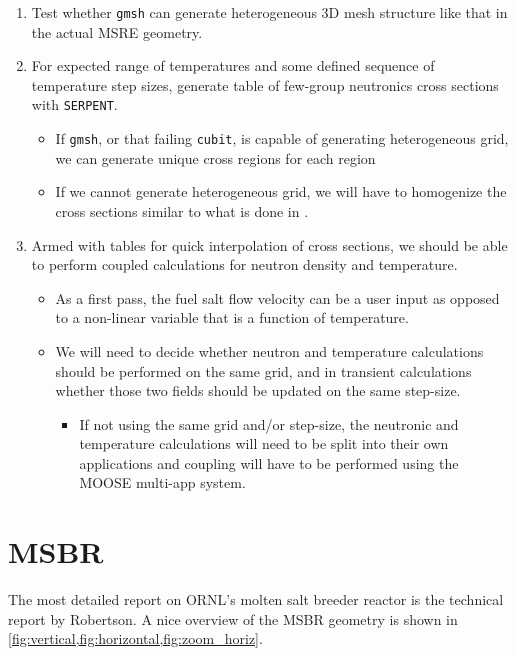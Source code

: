 \documentclass{article}
\let\Oldsection\section
\renewcommand{\section}{\FloatBarrier\Oldsection}
\newcommand{\code}[1]{\texttt{#1}}
\begin{document}
\begin{enumerate}
\item Test whether \code{gmsh} can generate heterogeneous 3D mesh structure
  like that in the actual \gls{MSRE} geometry.
\item For expected range of temperatures and some defined sequence of
  temperature step sizes, generate table of few-group neutronics cross sections
  with \code{SERPENT}.
  \begin{itemize}
    \item If \code{gmsh}, or that failing \code{cubit}, is capable of generating
      heterogeneous grid, we can generate unique cross regions for each region
    \item If we cannot generate heterogeneous grid, we will have to homogenize
      the cross sections similar to what is done in
      \cite{kophazi_development_????}.
  \end{itemize}
\item Armed with tables for quick interpolation of cross sections, we should be
  able to perform coupled calculations for neutron density and
  temperature.
  \begin{itemize}
    \item As a first pass, the fuel salt flow velocity can be a user input as
      opposed to a non-linear variable that is a function of temperature.
    \item We will need to decide whether neutron and temperature calculations
      should be performed on the same grid, and in transient calculations
      whether those two fields should be updated on the same step-size.
      \begin{itemize}
        \item If not using the same grid and/or step-size, the neutronic and
          temperature calculations will need to be split into their own
          applications and coupling will have to be performed using the MOOSE
          multi-app system.
      \end{itemize}
  \end{itemize}
\end{enumerate}

\section{MSBR}

The most detailed report on \gls{ORNL}'s molten salt breeder reactor is the technical
report by Robertson. \cite{robertson_conceptual_1971} A nice overview of the
MSBR geometry is shown in \cref{fig:vertical,fig:horizontal,fig:zoom_horiz}.
\end{document}
